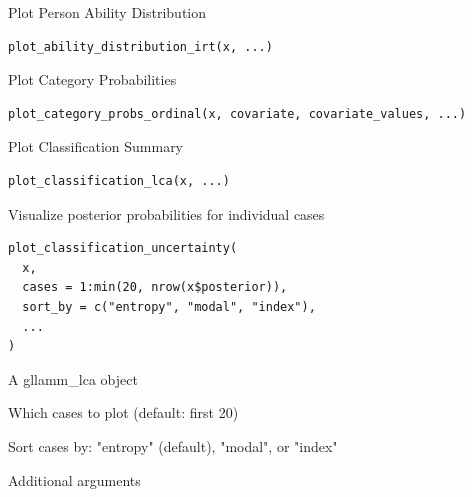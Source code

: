 \documentclass[a4paper]{book}
\begin{document}
%
\begin{Description}
Plot Person Ability Distribution
\end{Description}
%
\begin{Usage}
\begin{verbatim}
plot_ability_distribution_irt(x, ...)
\end{verbatim}
\end{Usage}
%
\begin{Description}
Plot Category Probabilities
\end{Description}
%
\begin{Usage}
\begin{verbatim}
plot_category_probs_ordinal(x, covariate, covariate_values, ...)
\end{verbatim}
\end{Usage}
%
\begin{Description}
Plot Classification Summary
\end{Description}
%
\begin{Usage}
\begin{verbatim}
plot_classification_lca(x, ...)
\end{verbatim}
\end{Usage}
%
\begin{Description}
Visualize posterior probabilities for individual cases
\end{Description}
%
\begin{Usage}
\begin{verbatim}
plot_classification_uncertainty(
  x,
  cases = 1:min(20, nrow(x$posterior)),
  sort_by = c("entropy", "modal", "index"),
  ...
)
\end{verbatim}
\end{Usage}
%
\begin{Arguments}
\begin{ldescription}
\item[\code{x}] A gllamm\_lca object

\item[\code{cases}] Which cases to plot (default: first 20)

\item[\code{sort\_by}] Sort cases by: "entropy" (default), "modal", or "index"

\item[\code{...}] Additional arguments
\end{ldescription}
\end{Arguments}
\end{document}
